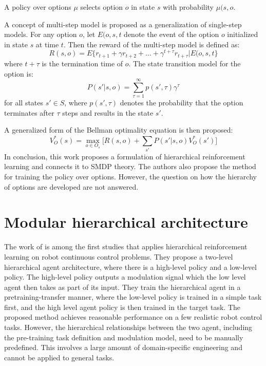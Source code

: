 A policy over options \(\mu \) selects option \(o\) in state \(s\) with probability \(\mu(s,o\).

A concept of multi-step model is proposed as a generalization of single-step models. For any option \(o\), let \(E(o,s,t\) denote the event of the option $o$ initialized in state $s$ at time $t$. Then the reward of the multi-step model is defined as:
\[ R(s,o)=E\{r_{t+1}+\gamma r_{t+2}+\ldots+\gamma^{t+\tau} r_{t+\tau} \lvert E(o,s,t\} \]
where $t+\tau$ is the termination time of $o$. The state transition model for the option is:
\[P(s' \lvert s,o)=\sum_{\tau=1}^{\infty} p(s',\tau) \gamma^\tau \]
for all states \(s' \in S \), where \( p(s',\tau) \) denotes the probability that the option terminates after \(\tau\) steps and results in the state \(s'\).

A generalized form of the Bellman optimality equation is then proposed:
\begin{equation}
    V_O^*(s) = \max_{o \in O_s} \big[ R(s,o)+\sum_{s'}P(s' \lvert s,o) V_O^*(s') \big]
\end{equation}
In conclusion, this work proposes a formulation of hierarchical reinforcement learning and connects it to SMDP theory. The authors also propose the method for training the policy over options. However, the question on how the hierarchy of options are developed are not answered.

\section{Modular hierarchical architecture}
The work of \cite{heess2016learning} is among the first studies that applies hierarchical reinforcement learning on robot continuous control problems. They propose a two-level hierarchical agent architecture, where there is a high-level policy and a low-level policy. The high-level policy outputs a modulation signal which the low level agent then takes as part of its input. They train the hierarchical agent in a pretraining-transfer manner, where the low-level policy is trained in a simple task first, and the high level agent policy is then trained in the target task. The proposed method achieves reasonable performance on a few realistic robot control tasks. However, the hierarchical relationships between the two agent, including the pre-training task definition and modulation model, need to be manually predefined. This involves a large amount of domain-specific engineering and cannot be applied to general tasks.


